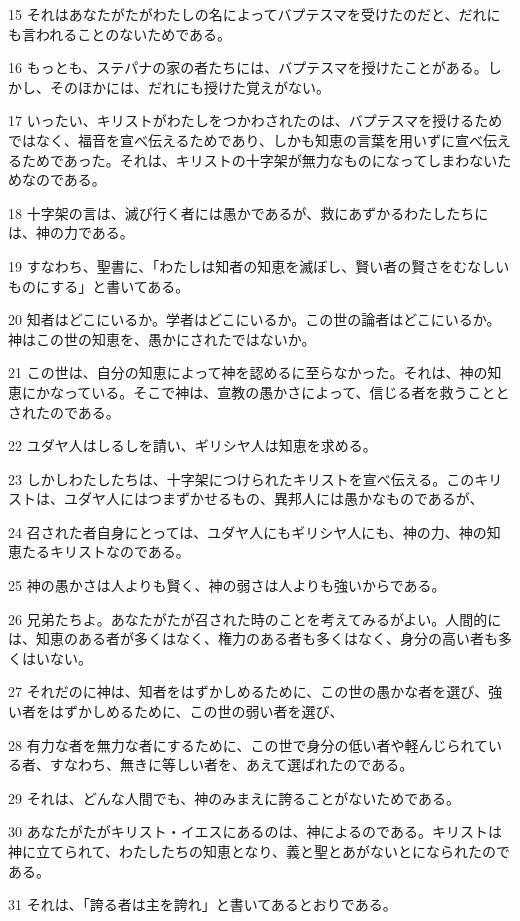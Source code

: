 \par 15 それはあなたがたがわたしの名によってバプテスマを受けたのだと、だれにも言われることのないためである。
\par 16 もっとも、ステパナの家の者たちには、バプテスマを授けたことがある。しかし、そのほかには、だれにも授けた覚えがない。
\par 17 いったい、キリストがわたしをつかわされたのは、バプテスマを授けるためではなく、福音を宣べ伝えるためであり、しかも知恵の言葉を用いずに宣べ伝えるためであった。それは、キリストの十字架が無力なものになってしまわないためなのである。
\par 18 十字架の言は、滅び行く者には愚かであるが、救にあずかるわたしたちには、神の力である。
\par 19 すなわち、聖書に、「わたしは知者の知恵を滅ぼし、賢い者の賢さをむなしいものにする」と書いてある。
\par 20 知者はどこにいるか。学者はどこにいるか。この世の論者はどこにいるか。神はこの世の知恵を、愚かにされたではないか。
\par 21 この世は、自分の知恵によって神を認めるに至らなかった。それは、神の知恵にかなっている。そこで神は、宣教の愚かさによって、信じる者を救うこととされたのである。
\par 22 ユダヤ人はしるしを請い、ギリシヤ人は知恵を求める。
\par 23 しかしわたしたちは、十字架につけられたキリストを宣べ伝える。このキリストは、ユダヤ人にはつまずかせるもの、異邦人には愚かなものであるが、
\par 24 召された者自身にとっては、ユダヤ人にもギリシヤ人にも、神の力、神の知恵たるキリストなのである。
\par 25 神の愚かさは人よりも賢く、神の弱さは人よりも強いからである。
\par 26 兄弟たちよ。あなたがたが召された時のことを考えてみるがよい。人間的には、知恵のある者が多くはなく、権力のある者も多くはなく、身分の高い者も多くはいない。
\par 27 それだのに神は、知者をはずかしめるために、この世の愚かな者を選び、強い者をはずかしめるために、この世の弱い者を選び、
\par 28 有力な者を無力な者にするために、この世で身分の低い者や軽んじられている者、すなわち、無きに等しい者を、あえて選ばれたのである。
\par 29 それは、どんな人間でも、神のみまえに誇ることがないためである。
\par 30 あなたがたがキリスト・イエスにあるのは、神によるのである。キリストは神に立てられて、わたしたちの知恵となり、義と聖とあがないとになられたのである。
\par 31 それは、「誇る者は主を誇れ」と書いてあるとおりである。

